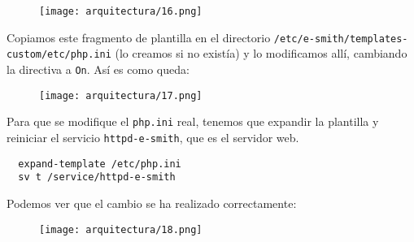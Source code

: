 \begin{figure}[H]
    \centering
    \texttt{[image: arquitectura/16.png]}
\end{figure}

Copiamos este fragmento de plantilla en el directorio \lstinline!/etc/e-smith/templates-custom/etc/php.ini! (lo creamos si no existía) y lo modificamos allí, cambiando la directiva a \lstinline!On!. Así es como queda:

\begin{figure}[H]
    \centering
    \texttt{[image: arquitectura/17.png]}
\end{figure}

Para que se modifique el \lstinline!php.ini! real, tenemos que expandir la plantilla y reiniciar el servicio \lstinline!httpd-e-smith!, que es el servidor web.

\begin{lstlisting}
  expand-template /etc/php.ini
  sv t /service/httpd-e-smith
\end{lstlisting}

Podemos ver que el cambio se ha realizado correctamente:

\begin{figure}[H]
    \centering
    \texttt{[image: arquitectura/18.png]}
\end{figure}
